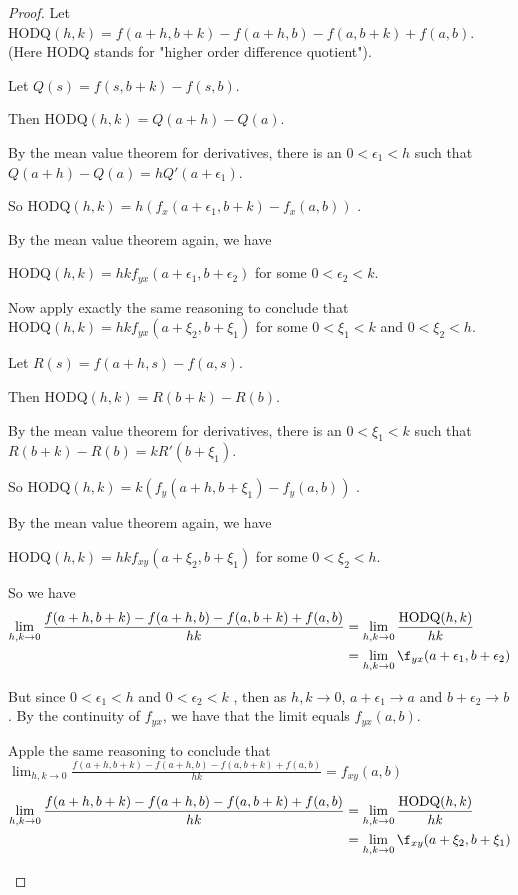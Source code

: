 \documentclass{ximera}
\begin{document}
	\begin{proof}
		Let $\textrm{HODQ}(h,k) = f(a+h,b+k)-f(a+h,b)-f(a,b+k)+f(a,b)$.  (Here $\textrm{HODQ}$ stands for "higher order difference quotient").
		
		Let $Q(s) = f(s,b+k) - f(s,b)$.
		
		Then $\textrm{HODQ}(h,k) = Q(a+h) - Q(a)$.
		
		By the mean value theorem for derivatives, there is an $0<\epsilon_1 < h$ such that 
		$Q(a+h)-Q(a) = hQ'(a+\epsilon_1)$.
		
		So $\textrm{HODQ}(h,k) = h( f_{x}(a+\epsilon_1,b+k) -f_x(a,b))$ .
		
		By the mean value theorem again, we have
		
		$\textrm{HODQ}(h,k) = hkf_{yx}(a+\epsilon_1,b+\epsilon_2)$ for some $0<\epsilon_2<k$.
		
		Now apply exactly the same reasoning to conclude that $\textrm{HODQ}(h,k) = hkf_{yx}(a+\xi_2,b+\xi_1)$ for some $0<\xi_1<k$ and $0<\xi_2<h$.
		\begin{free-response}
		
		Let $R(s) = f(a+h,s) - f(a,s)$.
		
		Then $\textrm{HODQ}(h,k) = R(b+k) - R(b)$.
		
		By the mean value theorem for derivatives, there is an $0<\xi_1 < k$ such that 
		$ R(b+k) - R(b) = kR'(b+\xi_1)$.
		
		So $\textrm{HODQ}(h,k) = k( f_y(a+h,b+\xi_1) -f_y(a,b))$ .
		
		By the mean value theorem again, we have
		
		$\textrm{HODQ}(h,k) = hkf_{xy}(a+\xi_2,b+\xi_1)$ for some $0<\xi_2<h$.
			
		\end{free-response}
		
		So we have 
		\begin{align*}
			\displaystyle\lim_{h,k \to 0} \frac{f(a+h,b+k)-f(a+h,b)-f(a,b+k)+f(a,b)}{hk} &= \displaystyle\lim_{h,k \to 0} \frac{\textrm{HODQ}(h,k)}{hk}\\
				&= \displaystyle\lim_{h,k \to 0} \f_{yx}( a+\epsilon_1,b+\epsilon_2) 
		\end{align*}
		
		But since $0<\epsilon_1 < h$ and $0<\epsilon_2<k$ , then as $h,k \to 0$, $a+\epsilon_1 \to a$ and $b+\epsilon_2 \to b$.  By the continuity of $f_{yx}$, we have that 
		the limit equals $f_{yx}(a,b)$.
		
		Apple the same reasoning to conclude that $\displaystyle\lim_{h,k \to 0} \frac{f(a+h,b+k)-f(a+h,b)-f(a,b+k)+f(a,b)}{hk} = f_{xy}(a,b)$
		\begin{free-response}
		\begin{align*}
			\displaystyle\lim_{h,k \to 0} \frac{f(a+h,b+k)-f(a+h,b)-f(a,b+k)+f(a,b)}{hk} &= \displaystyle\lim_{h,k \to 0} \frac{\textrm{HODQ}(h,k)}{hk}\\
				&= \displaystyle\lim_{h,k \to 0} \f_{xy}( a+\xi_2,b+\xi_1) 
		\end{align*}
		

\end{free-response}
\end{proof}
\end{document}
